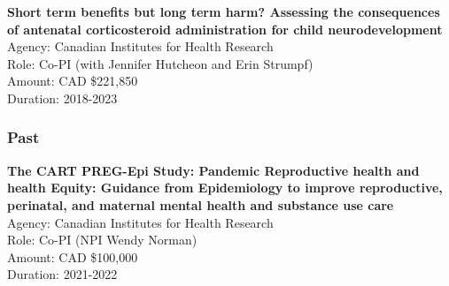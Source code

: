 \documentclass[
  letterpaper,
  DIV=11,
  numbers=noendperiod]{scrartcl}
\begin{document}
\textbf{Short term benefits but long term harm? Assessing the
consequences of antenatal corticosteroid administration for child
neurodevelopment}\\
\hspace*{0.333em}\hspace*{0.333em}\hspace*{0.333em}Agency: Canadian
Institutes for Health Research\\
\hspace*{0.333em}\hspace*{0.333em}\hspace*{0.333em}Role: Co-PI (with
Jennifer Hutcheon and Erin Strumpf)\\
\hspace*{0.333em}\hspace*{0.333em}\hspace*{0.333em}Amount: CAD
\$221,850\\
\hspace*{0.333em}\hspace*{0.333em}\hspace*{0.333em}Duration: 2018-2023\\

\subsubsection{Past}\label{past-1}

\textbf{The CART PREG-Epi Study: Pandemic Reproductive health and health
Equity: Guidance from Epidemiology to improve reproductive, perinatal,
and maternal mental health and substance use care}\\
\hspace*{0.333em}\hspace*{0.333em}\hspace*{0.333em}\hspace*{0.333em}Agency:
Canadian Institutes for Health Research\\
\hspace*{0.333em}\hspace*{0.333em}\hspace*{0.333em}\hspace*{0.333em}Role:
Co-PI (NPI Wendy Norman)\\
\hspace*{0.333em}\hspace*{0.333em}\hspace*{0.333em}\hspace*{0.333em}Amount:
CAD \$100,000\\
\hspace*{0.333em}\hspace*{0.333em}\hspace*{0.333em}\hspace*{0.333em}Duration:
2021-2022\\
\end{document}
